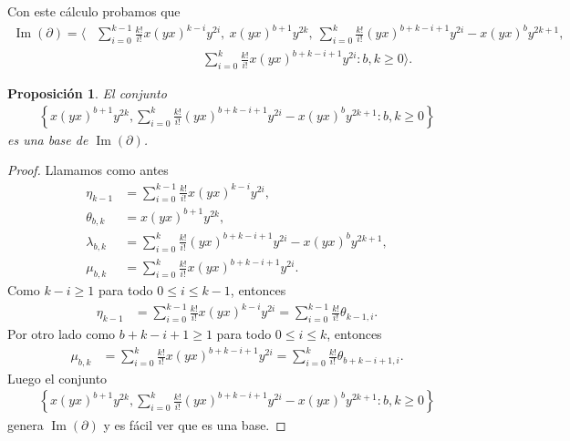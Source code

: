 \documentclass[a4paper,oneside,fleqn,11pt]{article}
\newtheorem{prop}{Proposición}
\numberwithin{prop}{subsection}
\DeclareMathOperator\Ima{Im}
\begin{document}
Con este cálculo probamos que
\begin{align*}
	\Ima(\partial) = \Bigg\langle & \sum_{i = 0}^{k - 1}\frac{k!}{i!}x(yx)^{k - i}y^{2i},
		\ x(yx)^{b + 1}y^{2k},
		\ \sum_{i = 0}^k\frac{k!}{i!}(yx)^{b + k - i + 1}y^{2i} - x(yx)^by^{2k + 1}, \\
		&\hspace{100pt}\sum_{i = 0}^k\frac{k!}{i!}x(yx)^{b + k - i + 1}y^{2i} : b,k \geq 0 \Bigg\rangle.
\end{align*}
\begin{prop}
\label{impartial}
El conjunto
\begin{align*}
		\left\{ x(yx)^{b + 1}y^{2k},
			\sum_{i = 0}^k\frac{k!}{i!}(yx)^{b + k - i + 1}y^{2i} - x(yx)^by^{2k + 1} :b, k \geq 0 \right\}
\end{align*}
es una base de $\Ima(\partial)$.
\end{prop}
\begin{proof}
Llamamos como antes
\begin{align*}
	\eta_{k - 1} &=  \sum_{i = 0}^{k-1}\frac{k!}{i!}x(yx)^{k - i}y^{2i}, \\
	\theta_{b,k} &= x(yx)^{b + 1}y^{2k},\\
	\lambda_{b,k} &= \sum_{i = 0}^k\frac{k!}{i!}(yx)^{b + k - i + 1}y^{2i} - x(yx)^by^{2k + 1}, \\
	\mu_{b,k} &= \sum_{i = 0}^k\frac{k!}{i!}x(yx)^{b + k - i + 1}y^{2i}.
\end{align*}
Como $k - i \geq 1$ para todo $0 \leq i \leq k -1$, entonces
\begin{align*}
	\eta_{k - 1} &= \sum_{i = 0}^{k-1}\frac{k!}{i!}x(yx)^{k - i}y^{2i} = \sum_{i = 0}^{k-1}\frac{k!}{i!}\theta_{k-1,i}.
\end{align*}
Por otro lado como $b + k - i + 1 \geq 1$ para todo $0 \leq i \leq k$, entonces
\begin{align*}
	\mu_{b,k} &= \sum_{i = 0}^k\frac{k!}{i!}x(yx)^{b + k - i + 1}y^{2i}
		= \sum_{i = 0}^k\frac{k!}{i!}\theta_{b + k - i + 1, i}.
\end{align*}
Luego el conjunto
\begin{align*}
	\left\{ x(yx)^{b + 1}y^{2k},
		\sum_{i = 0}^k\frac{k!}{i!}(yx)^{b + k - i + 1}y^{2i} - x(yx)^by^{2k + 1} :b,k \geq 0	\right\}
\end{align*}
 genera $\Ima(\partial)$ y es fácil ver que es una base.
\end{proof}
\end{document}
